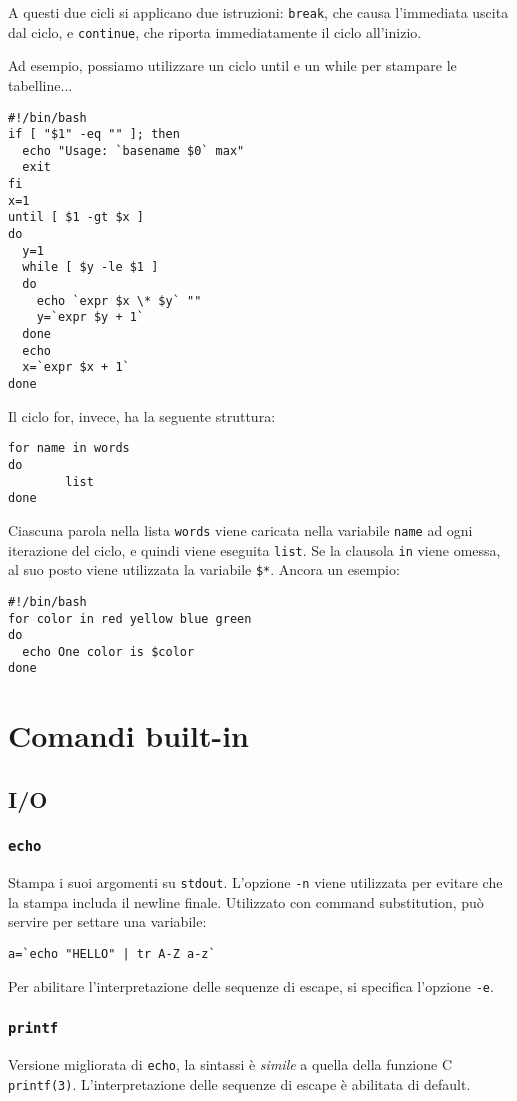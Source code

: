 A questi due cicli si applicano due istruzioni: \texttt{break}, che causa
l'immediata uscita dal ciclo, e \texttt{continue}, che riporta immediatamente
il ciclo all'inizio.

Ad esempio, possiamo utilizzare un ciclo until e un while per stampare le
tabelline...
\begin{verbatim}
#!/bin/bash
if [ "$1" -eq "" ]; then
  echo "Usage: `basename $0` max"
  exit
fi
x=1
until [ $1 -gt $x ]
do
  y=1
  while [ $y -le $1 ]
  do
    echo `expr $x \* $y` ""
    y=`expr $y + 1`
  done
  echo
  x=`expr $x + 1`
done
\end{verbatim}

Il ciclo for, invece, ha la seguente struttura:
\begin{verbatim}
for name in words
do
        list
done
\end{verbatim}

Ciascuna parola nella lista \texttt{words} viene caricata nella variabile
\texttt{name} ad ogni iterazione del ciclo, e quindi viene eseguita
\texttt{list}. Se la clausola \texttt{in} viene omessa, al suo posto viene
utilizzata la variabile \texttt{\$*}.
Ancora un esempio:
\begin{verbatim}
#!/bin/bash
for color in red yellow blue green
do
  echo One color is $color
done
\end{verbatim}

\section{Comandi built-in}
\subsection{I/O}
\subsubsection*{\texttt{echo}}
Stampa i suoi argomenti su \texttt{stdout}. L'opzione \texttt{-n} viene
utilizzata per evitare che la stampa includa il newline finale. Utilizzato con
command substitution, pu\`o servire per settare una variabile:
\begin{verbatim}
a=`echo "HELLO" | tr A-Z a-z`
\end{verbatim}
Per abilitare l'interpretazione delle sequenze di escape, si specifica
l'opzione \texttt{-e}.

\subsubsection*{\texttt{printf}}
Versione migliorata di \texttt{echo}, la sintassi \`e \emph{simile} a quella
della funzione C \texttt{printf(3)}. L'interpretazione delle sequenze di
escape \`e abilitata di default.

